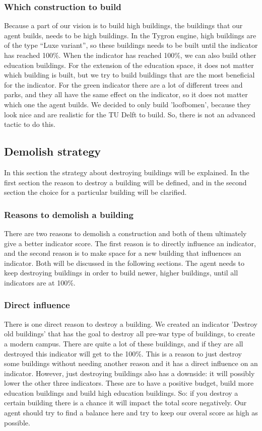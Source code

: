 \subsubsection{Which construction to build}
Because a part of our vision is to build high buildings, the buildings that our agent builds, needs to be high buildings. In the Tygron engine, high buildings are of the type “Luxe variant”, so these buildings needs to be built until the indicator has reached 100\%. When the indicator has reached 100\%, we can also build other education buildings. For the extension of the education space, it does not matter which building is built, but we try to build buildings that are the most beneficial for the indicator.
For the green indicator there are a lot of different trees and parks, and they all have the same effect on the indicator, so it does not matter which one the agent builds. We decided to only build 'loofbomen', because they look nice and are realistic for the TU Delft to build. So, there is not an advanced tactic to do this.

\subsection{Demolish strategy}
In this section the strategy about destroying buildings will be explained. In the first section the reason to destroy a building will be defined, and in the second section the choice for a particular building will be clarified. 

\subsubsection{Reasons to demolish a building}
There are two reasons to demolish a construction and both of them ultimately give a better indicator score. The first reason is to directly influence an indicator, and the second reason is to make space for a new building that influences an indicator. Both will be discussed in the following sections. The agent needs to keep destroying buildings in order to build newer, higher buildings, until all indicators are at 100\%.

\subsubsection{Direct influence}
There is one direct reason to destroy a building. We created an indicator 'Destroy old buildings' that has the goal to destroy all pre-war type of buildings, to create a modern campus. There are quite a lot of these buildings, and if they are all destroyed this indicator will get to the 100\%. This is a reason to just destroy some buildings without needing another reason and it has a direct influence on an indicator. However, just destroying buildings also has a downside: it will possibly lower the other three indicators. These are to have a positive budget, build more education buildings and build high education buildings. So: if you destroy a certain building there is a chance it will impact the total score negatively. Our agent should try to find a balance here and try to keep our overal score as high as possible.

